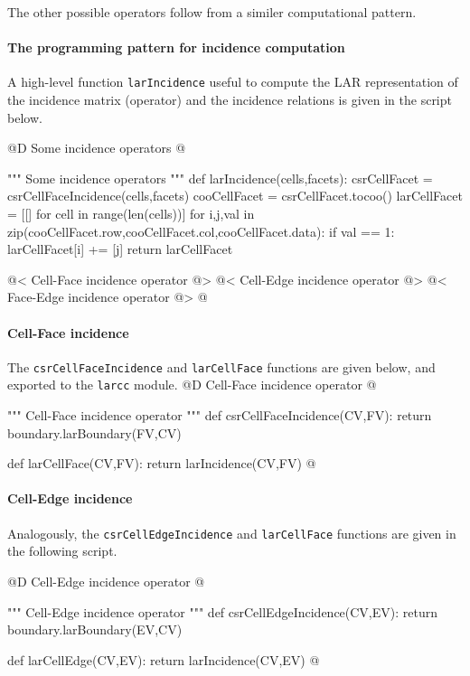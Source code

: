 \documentclass[11pt,oneside]{article}    %
\begin{document}
The other possible operators follow from a similer computational pattern.

\paragraph{The programming pattern for incidence computation}

A high-level function \texttt{larIncidence} useful to compute the LAR representation of the incidence matrix (operator) and the incidence relations is given in the script below.

@D Some incidence operators
@{""" Some incidence operators """
def larIncidence(cells,facets):
    csrCellFacet = csrCellFaceIncidence(cells,facets)
    cooCellFacet = csrCellFacet.tocoo()
    larCellFacet = [[] for cell in range(len(cells))]
    for i,j,val in zip(cooCellFacet.row,cooCellFacet.col,cooCellFacet.data):
        if val == 1: larCellFacet[i] += [j]
    return larCellFacet

@< Cell-Face incidence operator @>
@< Cell-Edge incidence operator @>
@< Face-Edge incidence operator @>
@}


\paragraph{Cell-Face incidence}
The \texttt{csrCellFaceIncidence} and \texttt{larCellFace} functions are given below, and exported to the \texttt{larcc} module.
@D Cell-Face incidence operator
@{""" Cell-Face incidence operator """
def csrCellFaceIncidence(CV,FV):
    return boundary.larBoundary(FV,CV)

def larCellFace(CV,FV):
    return larIncidence(CV,FV)
@}

\paragraph{Cell-Edge incidence}
Analogously, the \texttt{csrCellEdgeIncidence} and \texttt{larCellFace} functions are given in the following script.

@D Cell-Edge incidence operator
@{""" Cell-Edge incidence operator """
def csrCellEdgeIncidence(CV,EV):
     return boundary.larBoundary(EV,CV)

def larCellEdge(CV,EV):
    return larIncidence(CV,EV)
@}
\end{document}
